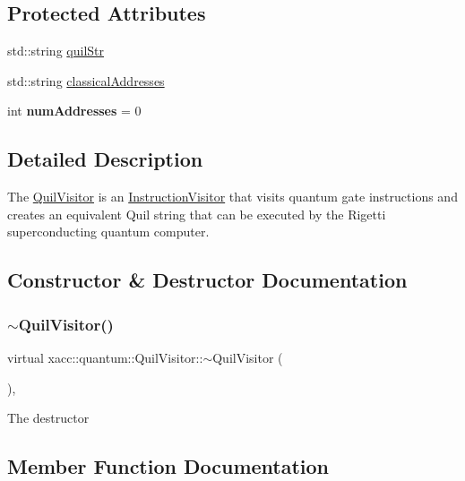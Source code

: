 \subsection*{Protected Attributes}
\begin{DoxyCompactItemize}
\item 
std\+::string \hyperlink{a01208_afd04300ce4dab03448a09f9bee448ca6}{quil\+Str}
\item 
std\+::string \hyperlink{a01208_a93e648797062568ff2ae0345f8843ddd}{classical\+Addresses}
\item 
\mbox{\label{a01208_ada92b9a834de74d79c22e1c5e88509ec}} 
int {\bfseries num\+Addresses} = 0
\end{DoxyCompactItemize}


\subsection{Detailed Description}
The \hyperlink{a01208}{Quil\+Visitor} is an \hyperlink{a02472}{Instruction\+Visitor} that visits quantum gate instructions and creates an equivalent Quil string that can be executed by the Rigetti superconducting quantum computer. 

\subsection{Constructor \& Destructor Documentation}
\mbox{\label{a01208_a90dcced4e75c7b45c287fb4edc58ed01}} 
\subsubsection{\texorpdfstring{$\sim$\+Quil\+Visitor()}{~QuilVisitor()}}
{\footnotesize\ttfamily virtual xacc\+::quantum\+::\+Quil\+Visitor\+::$\sim$\+Quil\+Visitor (\begin{DoxyParamCaption}{ }\end{DoxyParamCaption})\hspace{0.3cm}{\ttfamily [inline]}, {\ttfamily [virtual]}}

The destructor 

\subsection{Member Function Documentation}
\mbox{\label{a01208_ab4a1c6a92772a09c22068ced7d3dc76c}} 
